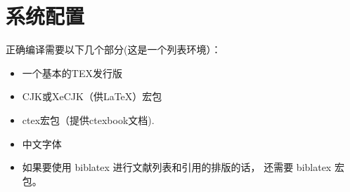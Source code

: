 \chapter{系统配置}
正确编译需要以下几个部分(这是一个列表环境）：
\begin{itemize}
\item 一个基本的TEX发行版
\item CJK或XeCJK（供\LaTeX{}）宏包
\item ctex宏包（提供ctexbook文档).
\item 中文字体
\item 如果要使用 biblatex 进行文献列表和引用的排版的话， 还需要 biblatex 宏包。
\end{itemize}